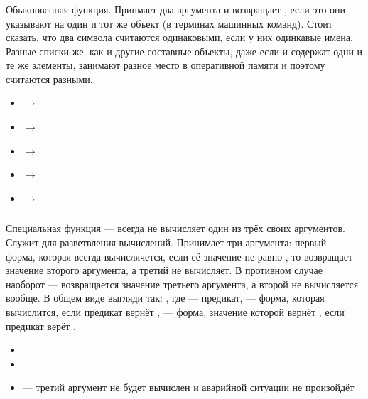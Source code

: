 \documentclass[a4paper, 12pt, titlepage, twoside]{article}
\newenvironment{examples}
               {\begin{itemize}\renewcommand{\labelitemi}{ }}
               {\end{itemize}}
\begin{document}
\subsubsection{}
Обыкновенная функция. Принмает два аргумента и возвращает , если это они указывают на один и тот же объект (в терминах машинных команд). Стоит сказать, что два символа считаются одинаковыми, если у них одинкавые имена. Разные списки же, как и другие составные объекты, даже если и содержат одни и те же элементы, занимают разное место в оперативной памяти и поэтому считаются разными.
\begin{examples}
\item {} $\longrightarrow$ 
\item {} $\longrightarrow$ 
\item {} $\longrightarrow$ 
\item {} $\longrightarrow$ 
\item {} $\longrightarrow$ 
\end{examples}
\subsubsection{}
Специальная функция --- всегда не вычисляет один из трёх своих аргументов. Служит для разветвления вычислений. Принимает три аргумента: первый --- форма, которая всегда вычислячется, если её значение не равно , то  возвращает значение второго аргумента, а третий не вычисляет. В противном случае наоборот --- возвращается значение третьего аргумента, а второй не вычисляется вообще. В общем виде выгляди так: , где  --- предикат,  --- форма, которая вычислится, если предикат вернёт ,  --- форма, значение которой вернёт , если предикат верёт .
\begin{examples}
  \item {}
  \item {}
  \item {} --- третий аргумент не будет вычислен и аварийной ситуации не произойдёт
\end{examples}
\end{document}
